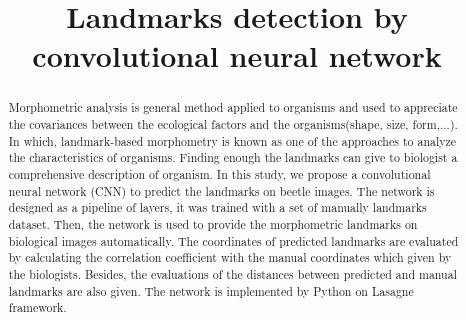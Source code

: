 \documentclass[conference]{IEEEtran}
\begin{document}
\title{Landmarks detection by convolutional neural network}

\author{
\and
{}
\and
{}
\and
{}

}

\maketitle

\begin{abstract}
Morphometric analysis is general method applied to organisms and used to appreciate the covariances between the ecological factors and the organisms(shape, size, form,...). In which, landmark-based morphometry is known as one of the approaches to analyze the characteristics of organisms. Finding enough the landmarks can give to biologist a comprehensive description of organism. In this study, we propose a convolutional neural network (CNN) to predict the landmarks on beetle images. The network is designed as a pipeline of layers, it was trained with a set of manually landmarks dataset. Then, the network is used to provide the morphometric landmarks on biological images automatically. The coordinates of predicted landmarks are evaluated by calculating the correlation coefficient with the manual coordinates which given by the biologists. Besides, the evaluations of the distances between predicted and manual landmarks are also given. The network is implemented by Python on Lasagne framework.
\end{abstract}
\end{document}
